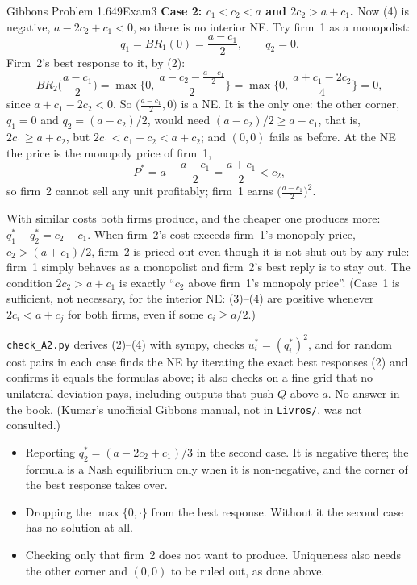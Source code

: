 \begin{exsol}{Gibbons Problem 1.6}{49}{Exam}{3}
\textbf{Case 2: $c_1 < c_2 < a$ and $2c_2 > a + c_1$.} Now (4) is negative,
$a - 2c_2 + c_1 < 0$, so there is no interior NE. Try firm~1 as a monopolist:
\[
  q_1 = BR_1(0) = \frac{a - c_1}{2}, \qquad q_2 = 0 .
\]
Firm~2's best response to it, by (2):
\[
  BR_2\Big(\frac{a - c_1}{2}\Big) = \max\Big\{0,\ \frac{a - c_2 - \frac{a - c_1}{2}}{2}\Big\}
  = \max\Big\{0,\ \frac{a + c_1 - 2c_2}{4}\Big\} = 0 ,
\]
since $a + c_1 - 2c_2 < 0$. So $\big(\tfrac{a - c_1}{2}, 0\big)$ is a NE. It is the only one: the
other corner, $q_1 = 0$ and $q_2 = (a - c_2)/2$, would need $(a - c_2)/2 \ge a - c_1$, that is,
$2c_1 \ge a + c_2$, but $2c_1 < c_1 + c_2 < a + c_2$; and $(0,0)$ fails as before. At the NE the
price is the monopoly price of firm~1,
\[
  P^* = a - \frac{a - c_1}{2} = \frac{a + c_1}{2} < c_2 ,
\]
so firm~2 cannot sell any unit profitably; firm~1 earns $\big(\frac{a - c_1}{2}\big)^2$.

\interp With similar costs both firms produce, and the cheaper one produces more:
$q_1^* - q_2^* = c_2 - c_1$. When firm~2's cost exceeds firm~1's monopoly price,
$c_2 > (a + c_1)/2$, firm~2 is priced out even though it is not shut out by any rule: firm~1
simply behaves as a monopolist and firm~2's best reply is to stay out. The condition
$2c_2 > a + c_1$ is exactly ``$c_2$ above firm~1's monopoly price''. (Case~1 is sufficient, not
necessary, for the interior NE: (3)--(4) are positive whenever $2c_i < a + c_j$ for both firms,
even if some $c_i \ge a/2$.)

\verify \texttt{check\_A2.py} derives (2)--(4) with sympy, checks $u_i^* = (q_i^*)^2$, and for
random cost pairs in each case finds the NE by iterating the exact best responses (2) and confirms
it equals the formulas above; it also checks on a fine grid that no unilateral deviation pays,
including outputs that push $Q$ above $a$. No answer in the book. (Kumar's unofficial Gibbons
manual, not in \texttt{Livros/}, was not consulted.)

\mistakes
\begin{itemize}
  \item Reporting $q_2^* = (a - 2c_2 + c_1)/3$ in the second case. It is negative there; the formula is a Nash equilibrium only when it is non-negative, and the corner of the best response takes over.
  \item Dropping the $\max\{0,\cdot\}$ from the best response. Without it the second case has no solution at all.
  \item Checking only that firm~2 does not want to produce. Uniqueness also needs the other corner and $(0,0)$ to be ruled out, as done above.
\end{itemize}

\end{exsol}

